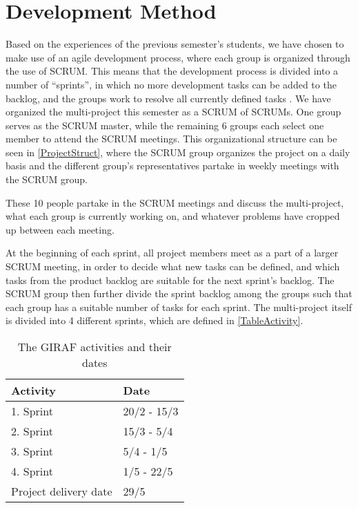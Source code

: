\section{Development Method}
Based on the experiences of the previous semester's students, we have chosen
to make use of an agile development process, where each group is organized through
the use of SCRUM. This means that the development process is divided into a
number of ``sprints'', in which no more development tasks can be added to the backlog, 
and the groups work to resolve all currently defined tasks \citep[Ch.7
p.109-111]{Larman2004}. We have organized the multi-project this semester as a SCRUM of SCRUMs. One group serves
as the SCRUM master, while the remaining 6 groups each select one member to
attend the SCRUM meetings. This organizational structure can be seen in
\autoref{ProjectStruct}, where the SCRUM group organizes the project on a daily
basis and the different group's representatives partake in weekly meetings with
the SCRUM group.


These 10 people partake in the SCRUM meetings and discuss the
multi-project, what each group is currently working on, and whatever problems
have cropped up between each meeting.\nl

At the beginning of each sprint, all project members meet as a part of a larger
SCRUM meeting, in order to decide what new tasks can be defined, and which tasks
from the product backlog are suitable for the next sprint's backlog. The SCRUM
group then further divide the sprint backlog among the groups such that each
group has a suitable number of tasks for each sprint. The multi-project itself
is divided into 4 different sprints, which are defined in
\autoref{TableActivity}.

\begin{table}[H]
\centering
\begin{tabular}{|l|l|}
\hline
Activity & Date \\ \hline
1. Sprint & 20/2 - 15/3 \\\hline 
2. Sprint & 15/3 - 5/4\\\hline 
3. Sprint & 5/4 - 1/5\\\hline 
4. Sprint & 1/5 - 22/5\\\hline 
Project delivery date & 29/5\\\hline
\end{tabular}
\caption{The GIRAF activities and their dates}
\label{TableActivity}
\end{table}

